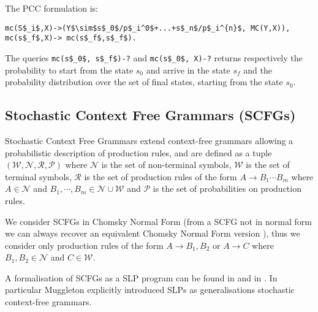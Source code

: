 \documentclass[letterpaper]{article}
\theoremstyle{plain}
\theoremstyle{definition}
\theoremstyle{remark}
\theoremstyle{definition}
\begin{document}

The PCC formulation is:
\begin{lstlisting}[mathescape=true]
mc(S$_i$,X)->(Y$\sim$s$_0$/p$_i^0$+...+s$_n$/p$_i^{n}$, MC(Y,X)),
mc(s$_f$,X)-> mc(s$_f$,s$_f$).
\end{lstlisting}
The queries \lstinline[mathescape=true]{mc(s$_0$, s$_f$)-?} and \lstinline[mathescape=true]{mc(s$_0$, X)-?} returns respectively the probability to start from the state $s_0$ and arrive in the state $s_f$ and the probability distribution over the set of final states, starting from the state $s_0$.




\subsection{Stochastic Context Free Grammars (SCFGs)}
Stochastic Context Free Grammars \cite{SCFG_1,SCFG_2} extend context-free grammars allowing a probabilistic description of production rules, and are defined as a tuple $(\mathcal{W},\mathcal{N},\mathcal{R},\mathcal{P})$
where
$\mathcal{N}$ is the set of non-terminal symbols,
$\mathcal{W}$ is the set of terminal symbols,
$\mathcal{R}$ is the set of production rules of the form $A \rightarrow B_1 \cdots B_m$ where $A \in \mathcal{N}$ and  $B_1 , \cdots , B_m \in  \mathcal{N} \cup \mathcal{W}$ and 
$\mathcal{P}$ is the set of probabilities on production rules.

We consider SCFGs in Chomsky Normal Form (from a SCFG not in normal form we can always recover an equivalent Chomsky Normal Form version \cite{chomsky56}), thus we consider only production rules of the form  $A \rightarrow B_1, B_2$ or  $A \rightarrow C$ where $B_1,B_2 \in \mathcal{N}$ and $C \in \mathcal{W}$.

A formalisation of SCFGs as a SLP program can be found in \cite{SLPmuggleton96} and in \cite{SLPcussens2001}.
In particular Muggleton \cite{SLPmuggleton96} explicitly introduced SLPs as generalisations stochastic context-free grammars.
\end{document}
